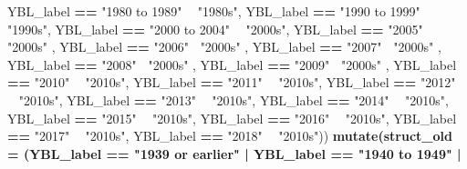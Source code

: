 \documentclass[
]{article}
\newenvironment{Shaded}{\begin{snugshade}}{\end{snugshade}}
\newcommand{\DataTypeTok}[1]{\textcolor[rgb]{0.13,0.29,0.53}{#1}}
\newcommand{\KeywordTok}[1]{\textcolor[rgb]{0.13,0.29,0.53}{\textbf{#1}}}
\newcommand{\NormalTok}[1]{#1}
\newcommand{\OperatorTok}[1]{\textcolor[rgb]{0.81,0.36,0.00}{\textbf{#1}}}
\newcommand{\StringTok}[1]{\textcolor[rgb]{0.31,0.60,0.02}{#1}}
\begin{document}
\begin{Shaded}
\begin{Highlighting}[]
{{{{\NormalTok{                        YBL_label }\OperatorTok{==}\StringTok{ "1980 to 1989"} \OperatorTok{~}\StringTok{ "1980s"}\NormalTok{,}
\NormalTok{                        YBL_label }\OperatorTok{==}\StringTok{ "1990 to 1999"} \OperatorTok{~}\StringTok{ "1990s"}\NormalTok{,}
\NormalTok{                        YBL_label }\OperatorTok{==}\StringTok{ "2000 to 2004"} \OperatorTok{~}\StringTok{ "2000s"}\NormalTok{,}
\NormalTok{                        YBL_label }\OperatorTok{==}\StringTok{ "2005"}\OperatorTok{~}\StringTok{ "2000s"}\NormalTok{ ,}
\NormalTok{                        YBL_label }\OperatorTok{==}\StringTok{ "2006"}\OperatorTok{~}\StringTok{ "2000s"}\NormalTok{ ,}
\NormalTok{                        YBL_label }\OperatorTok{==}\StringTok{ "2007"}\OperatorTok{~}\StringTok{ "2000s"}\NormalTok{ ,}
\NormalTok{                        YBL_label }\OperatorTok{==}\StringTok{ "2008"}\OperatorTok{~}\StringTok{ "2000s"}\NormalTok{ ,}
\NormalTok{                        YBL_label }\OperatorTok{==}\StringTok{ "2009"}\OperatorTok{~}\StringTok{ "2000s"}\NormalTok{ ,}
\NormalTok{                               YBL_label }\OperatorTok{==}\StringTok{ "2010"} \OperatorTok{~}\StringTok{ "2010s"}\NormalTok{,}
\NormalTok{                               YBL_label }\OperatorTok{==}\StringTok{ "2011"} \OperatorTok{~}\StringTok{ "2010s"}\NormalTok{,}
\NormalTok{                               YBL_label }\OperatorTok{==}\StringTok{ "2012"} \OperatorTok{~}\StringTok{ "2010s"}\NormalTok{,}
\NormalTok{                               YBL_label }\OperatorTok{==}\StringTok{ "2013"} \OperatorTok{~}\StringTok{ "2010s"}\NormalTok{,}
\NormalTok{                               YBL_label }\OperatorTok{==}\StringTok{ "2014"} \OperatorTok{~}\StringTok{ "2010s"}\NormalTok{,}
\NormalTok{                               YBL_label }\OperatorTok{==}\StringTok{ "2015"} \OperatorTok{~}\StringTok{ "2010s"}\NormalTok{,}
\NormalTok{                               YBL_label }\OperatorTok{==}\StringTok{ "2016"} \OperatorTok{~}\StringTok{ "2010s"}\NormalTok{,}
\NormalTok{                               YBL_label }\OperatorTok{==}\StringTok{ "2017"} \OperatorTok{~}\StringTok{ "2010s"}\NormalTok{,}
\NormalTok{                               YBL_label }\OperatorTok{==}\StringTok{ "2018"} \OperatorTok{~}\StringTok{ "2010s"}\NormalTok{)) }\OperatorTok{%>%}
\StringTok{    }
\KeywordTok{mutate}\NormalTok{(}\DataTypeTok{struct_old =}\NormalTok{ (YBL_label }\OperatorTok{==}\StringTok{ "1939 or earlier"} \OperatorTok{|}
\StringTok{                       }\NormalTok{YBL_label }\OperatorTok{==}\StringTok{ "1940 to 1949"} \OperatorTok{|}\StringTok{ }
}}}}}
\end{Highlighting}
\end{Shaded}
\end{document}
